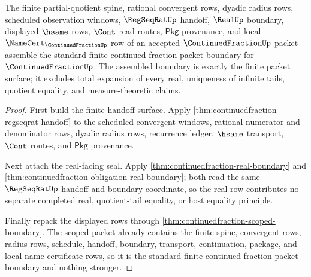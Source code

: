 \begin{theorem}
\label{thm:continuedfraction-finite-packet-standard-bridge}
The finite partial-quotient spine, rational convergent rows, dyadic radius
rows, scheduled observation windows, $\RegSeqRatUp$ handoff, $\RealUp$
boundary, displayed $\hsame$ rows, $\Cont$ read routes, $\mathsf{Pkg}$
provenance, and local $\NameCert_{\ContinuedFractionUp}$ row of an accepted
$\ContinuedFractionUp$ packet assemble the standard finite continued-fraction
packet boundary for $\ContinuedFractionUp$. The assembled boundary is exactly
the finite packet surface; it excludes total expansion of every real,
uniqueness of infinite tails, quotient equality, and measure-theoretic claims.
\end{theorem}
\begin{proof}
First build the finite handoff surface. Apply
\autoref{thm:continuedfraction-regseqrat-handoff} to the scheduled convergent
windows, rational numerator and denominator rows, dyadic radius rows,
recurrence ledger, $\hsame$ transport, $\Cont$ routes, and $\mathsf{Pkg}$
provenance.

Next attach the real-facing seal. Apply
\autoref{thm:continuedfraction-real-boundary} and
\autoref{thm:continuedfraction-obligation-real-boundary}; both read the same
$\RegSeqRatUp$ handoff and boundary coordinate, so the real row contributes no
separate completed real, quotient-tail equality, or host equality principle.

Finally repack the displayed rows through
\autoref{thm:continuedfraction-scoped-boundary}. The scoped packet already
contains the finite spine, convergent rows, radius rows, schedule, handoff,
boundary, transport, continuation, package, and local name-certificate rows,
so it is the standard finite continued-fraction packet boundary and nothing
stronger.
\end{proof}

